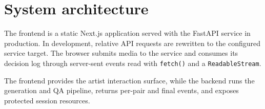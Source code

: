\section{System architecture}
The frontend is a static Next.js application served with the FastAPI service in production. In development, relative API requests are rewritten to the configured service target. The browser submits media to the service and consumes its decision log through server-sent events read with \texttt{fetch()} and a \texttt{ReadableStream}.

The frontend provides the artist interaction surface, while the backend runs the generation and QA pipeline, returns per-pair and final events, and exposes protected session resources.
